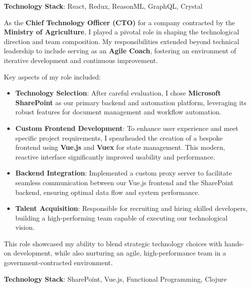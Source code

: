 \textbf{Technology Stack}:
React, Redux, ReasonML, GraphQL, Crystal

\vfill
\divider
\vfill

As the \textbf{Chief Technology Officer (CTO)} for a company contracted by the \textbf{Ministry of Agriculture}, I played a pivotal role in shaping the technological direction and team composition. My responsibilities extended beyond technical leadership to include serving as an \textbf{Agile Coach}, fostering an environment of iterative development and continuous improvement.

Key aspects of my role included:

\begin{itemize}
    \item \textbf{Technology Selection}: After careful evaluation, I chose \textbf{Microsoft SharePoint} as our primary backend and automation platform, leveraging its robust features for document management and workflow automation.
    
    \item \textbf{Custom Frontend Development}: To enhance user experience and meet specific project requirements, I spearheaded the creation of a bespoke frontend using \textbf{Vue.js} and \textbf{Vuex} for state management. This modern, reactive interface significantly improved usability and performance.
    
    \item \textbf{Backend Integration}: Implemented a custom proxy server to facilitate seamless communication between our Vue.js frontend and the SharePoint backend, ensuring optimal data flow and system performance.
    
    \item \textbf{Talent Acquisition}: Responsible for recruiting and hiring skilled developers, building a high-performing team capable of executing our technological vision.
\end{itemize}

This role showcased my ability to blend strategic technology choices with hands-on development, while also nurturing an agile, high-performance team in a government-contracted environment.

\smallskip
\textbf{Technology Stack}:
SharePoint, Vue.js, Functional Programming, Clojure

\vspace{2cm}
\newpage
{}
\bigskip

